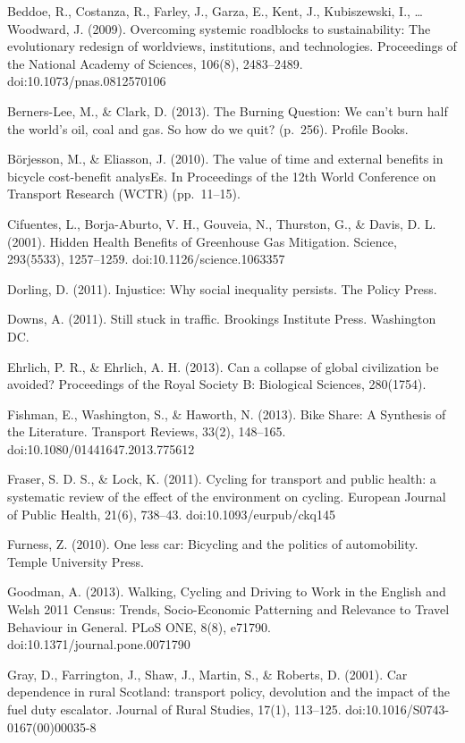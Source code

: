 Beddoe, R., Costanza, R., Farley, J., Garza, E., Kent, J., Kubiszewski,
I., \ldots{} Woodward, J. (2009). Overcoming systemic roadblocks to
sustainability: The evolutionary redesign of worldviews, institutions,
and technologies. Proceedings of the National Academy of Sciences,
106(8), 2483--2489. doi:10.1073/pnas.0812570106

Berners-Lee, M., \& Clark, D. (2013). The Burning Question: We can't
burn half the world's oil, coal and gas. So how do we quit? (p.~256).
Profile Books.

Börjesson, M., \& Eliasson, J. (2010). The value of time and external
benefits in bicycle cost-benefit analysEs. In Proceedings of the 12th
World Conference on Transport Research (WCTR) (pp.~11--15).

Cifuentes, L., Borja-Aburto, V. H., Gouveia, N., Thurston, G., \& Davis,
D. L. (2001). Hidden Health Benefits of Greenhouse Gas Mitigation.
Science, 293(5533), 1257--1259. doi:10.1126/science.1063357

Dorling, D. (2011). Injustice: Why social inequality persists. The
Policy Press.

Downs, A. (2011). Still stuck in traffic. Brookings Institute Press.
Washington DC.

Ehrlich, P. R., \& Ehrlich, A. H. (2013). Can a collapse of global
civilization be avoided? Proceedings of the Royal Society B: Biological
Sciences, 280(1754).

Fishman, E., Washington, S., \& Haworth, N. (2013). Bike Share: A
Synthesis of the Literature. Transport Reviews, 33(2), 148--165.
doi:10.1080/01441647.2013.775612

Fraser, S. D. S., \& Lock, K. (2011). Cycling for transport and public
health: a systematic review of the effect of the environment on cycling.
European Journal of Public Health, 21(6), 738--43.
doi:10.1093/eurpub/ckq145

Furness, Z. (2010). One less car: Bicycling and the politics of
automobility. Temple University Press.

Goodman, A. (2013). Walking, Cycling and Driving to Work in the English
and Welsh 2011 Census: Trends, Socio-Economic Patterning and Relevance
to Travel Behaviour in General. PLoS ONE, 8(8), e71790.
doi:10.1371/journal.pone.0071790

Gray, D., Farrington, J., Shaw, J., Martin, S., \& Roberts, D. (2001).
Car dependence in rural Scotland: transport policy, devolution and the
impact of the fuel duty escalator. Journal of Rural Studies, 17(1),
113--125. doi:10.1016/S0743-0167(00)00035-8

